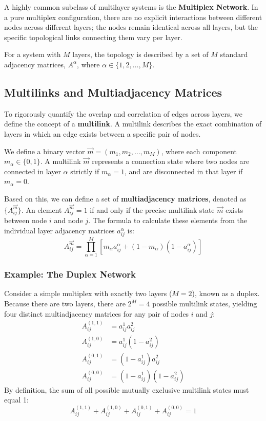 A highly common subclass of multilayer systems is the \textbf{Multiplex Network}. In a pure multiplex configuration, there are no explicit interactions between different nodes across different layers; the nodes remain identical across all layers, but the specific topological links connecting them vary per layer.

For a system with \(M\) layers, the topology is described by a set of \(M\) standard adjacency matrices, \(A^\alpha\), where \(\alpha \in \{1, 2, \dots, M\}\).

\subsection{Multilinks and Multiadjacency Matrices}
\label{subsec:multilinks_multiadjacency}

To rigorously quantify the overlap and correlation of edges across layers, we define the concept of a \textbf{multilink}. A multilink describes the exact combination of layers in which an edge exists between a specific pair of nodes.

We define a binary vector \(\vec{m} = (m_1, m_2, \dots, m_M)\), where each component \(m_\alpha \in \{0, 1\}\). A multilink \(\vec{m}\) represents a connection state where two nodes are connected in layer \(\alpha\) strictly if \(m_\alpha = 1\), and are disconnected in that layer if \(m_\alpha = 0\).

Based on this, we can define a set of \textbf{multiadjacency matrices}, denoted as \(\{A_{ij}^{\vec{m}}\}\). An element \(A_{ij}^{\vec{m}} = 1\) if and only if the precise multilink state \(\vec{m}\) exists between node \(i\) and node \(j\). The formula to calculate these elements from the individual layer adjacency matrices \(a_{ij}^\alpha\) is:
\[
    A_{ij}^{\vec{m}} = \prod_{\alpha=1}^M \left[ m_\alpha a_{ij}^\alpha + (1 - m_\alpha)(1 - a_{ij}^\alpha) \right]
\]

\subsubsection{Example: The Duplex Network}
\label{subsubsec:duplex_example}

Consider a simple multiplex with exactly two layers (\(M = 2\)), known as a duplex. Because there are two layers, there are \(2^M = 4\) possible multilink states, yielding four distinct multiadjacency matrices for any pair of nodes \(i\) and \(j\):
\begin{align*}
    A_{ij}^{(1,1)} & = a_{ij}^1 a_{ij}^2             \\
    A_{ij}^{(1,0)} & = a_{ij}^1 (1 - a_{ij}^2)       \\
    A_{ij}^{(0,1)} & = (1 - a_{ij}^1) a_{ij}^2       \\
    A_{ij}^{(0,0)} & = (1 - a_{ij}^1) (1 - a_{ij}^2)
\end{align*}
By definition, the sum of all possible mutually exclusive multilink states must equal 1:
\[
    A_{ij}^{(1,1)} + A_{ij}^{(1,0)} + A_{ij}^{(0,1)} + A_{ij}^{(0,0)} = 1
\]

